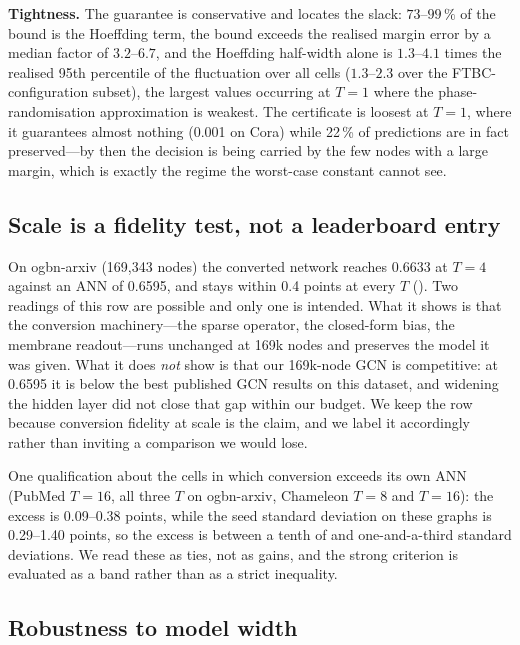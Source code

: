 \textbf{Tightness.} The guarantee is conservative and  locates the slack:
$73$--$99\,\%$ of the bound is the Hoeffding term, the bound exceeds the realised margin error by a
median factor of $3.2$--$6.7$, and the Hoeffding half-width alone is $1.3$--$4.1$ times the
realised 95th percentile of the fluctuation over all cells ($1.3$--$2.3$ over the FTBC-configuration
subset), the largest values occurring at $T=1$ where the
phase-randomisation approximation is weakest. The certificate is loosest at $T=1$, where it
guarantees almost nothing (0.001 on Cora) while 22\,\% of predictions are in fact preserved---by
then the decision is being carried by the few nodes with a large margin, which is exactly the
regime the worst-case constant cannot see.

\subsection{Scale is a fidelity test, not a leaderboard entry}
\label{sec:scale}

On ogbn-arxiv (169{,}343 nodes) the converted network reaches 0.6633 at $T=4$ against an ANN of
0.6595, and stays within 0.4 points at every $T$ (). Two readings of this row are
possible and only one is intended. What it shows is that the conversion machinery---the sparse
operator, the closed-form bias, the membrane readout---runs unchanged at 169k nodes and preserves
the model it was given. What it does \emph{not} show is that our 169k-node GCN is competitive: at
0.6595 it is below the best published GCN results on this dataset, and widening the hidden layer
did not close that gap within our budget. We keep the row because conversion fidelity at scale is
the claim, and we label it accordingly rather than inviting a comparison we would lose.

One qualification about the cells in which conversion exceeds its own ANN (PubMed $T=16$, all
three $T$ on ogbn-arxiv, Chameleon $T=8$ and $T=16$): the excess is 0.09--0.38 points, while the
seed standard deviation on these graphs is 0.29--1.40 points, so the excess is between a tenth of
and one-and-a-third standard deviations. We read these as ties, not as gains, and the strong
criterion is evaluated as a band rather than as a strict inequality.

\subsection{Robustness to model width}
\label{sec:width}

